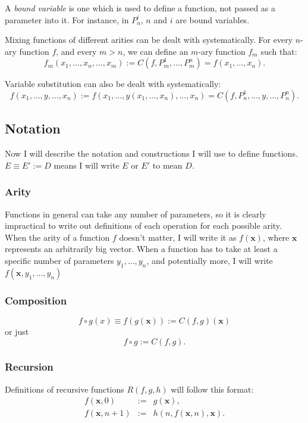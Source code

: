 \documentclass[a4paper]{article}
\newcommand{\xvec}{\mathbf{x}}	%
\theoremstyle{plain}
\theoremstyle{definition}
\begin{document}
A \textit{bound variable} is one which is used to define a function, not passed as a parameter into it. For instance, in $P_n^i$, $n$ and $i$ are bound variables.

Mixing functions of different arities can be dealt with systematically. For every $n$-ary function $f$, and every $m > n$, we can define an $m$-ary function $f_m$ such that:
\[f_m(x_1, \dots, x_n, \dots, x_m) := C(f,P_m^1, \dots, P_m^n) = f(x_1, \dots, x_n).\]

Variable substitution can also be dealt with systematically:
\[f(x_1, \dots, y, \dots, x_n) := f(x_1, \dots, y(x_1, \dots, x_n), \dots, x_n) = C(f,P_n^1, \dots, y, \dots, P_n^n). \]

\subsection{Notation}
Now I will describe the notation and constructions I will use to define functions. $E \equiv E' := D$ means I will write $E$ or $E'$ to mean $D$.

\subsubsection*{Arity}
Functions in general can take any number of parameters, so it is clearly impractical to write out definitions of each operation for each possible arity. When the arity of a function $f$ doesn't matter, I will write it as $f(\xvec)$, where $\xvec$ represents an arbitrarily big vector.  When a function has to take at least a specific number of parameters $y_1, \dots, y_n$, and potentially more, I will write $f(\xvec, y_1, \dots, y_n)$

\subsubsection*{Composition} 
\[f \circ g(x) \equiv f(g(\xvec)) := C(f,g)(\xvec)\] 
or just 
\[f \circ g := C(f,g).\]

\subsubsection*{Recursion}
Definitions of recursive functions $R(f,g,h)$ will follow this format:
\begin{eqnarray*}
	f(\xvec,0) & := & g(\xvec), \\
	f(\xvec,n+1) & := & h(n,f(\xvec,n),\xvec).
\end{eqnarray*} 
\end{document}
